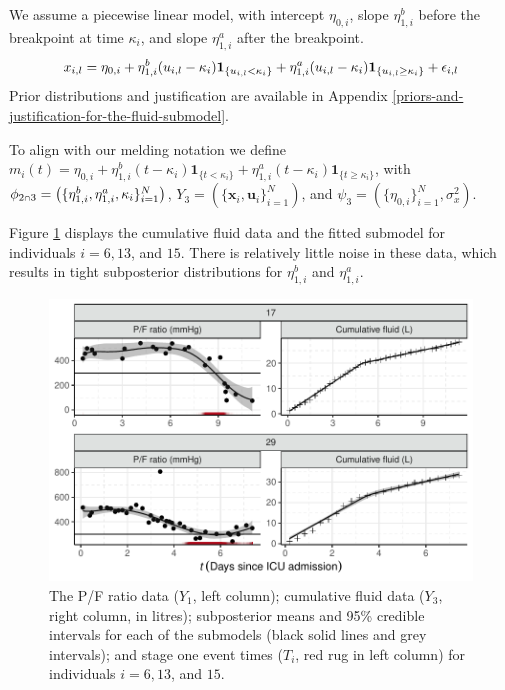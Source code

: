 \documentclass[
  10pt,
  a4paper,
]{article}
\let\Oldcap\cap
\renewcommand{\cap}{\mathrel{\mathsmaller{\Oldcap}}}
\begin{document}
We assume a piecewise linear model, with intercept \(\eta_{0, i}\),
slope \(\eta_{1, i}^{b}\) before the breakpoint at time \(\kappa_{i}\),
and slope \(\eta_{1, i}^{a}\) after the breakpoint. \begin{equation}
  x_{i, l} = \eta_{0, i} + \eta^{b}_{1, i}(u_{i, l} - \kappa_{i})\boldsymbol{1}_{\{u_{i, l} < \kappa_{i}\}} + \eta^{a}_{1, i}(u_{i, l} - \kappa_{i})\boldsymbol{1}_{\{u_{i, l} \geq \kappa_{i}\}} + \epsilon_{i, l} \\
   \label{eqn:piecewise-fluid-model}
\end{equation} Prior distributions and justification are available in
Appendix \ref{priors-and-justification-for-the-fluid-submodel}.

To align with our melding notation we define
\(m_{i}(t) = \eta_{0, i} + \eta^{b}_{1, i}(t - \kappa_{i})\boldsymbol{1}_{\{t < \kappa_{i}\}} + \eta^{a}_{1, i}(t - \kappa_{i})\boldsymbol{1}_{\{t \geq \kappa_{i}\}}\),
with
\(\phi_{2 \cap 3} = \left(\{\eta^{b}_{1, i}, \eta^{a}_{1, i}, \kappa_{i}\}_{i = 1}^{N}\right)\),
\(Y_{3} = (\{\boldsymbol{x}_{i}, \boldsymbol{u}_{i}\}_{i = 1}^{N})\),
and \(\psi_{3} = (\{\eta_{0, i}\}_{i = 1}^{N}, \sigma^{2}_{x})\).

Figure \ref{fig:pf_fit_and_fluid_fit_plot} displays the cumulative fluid
data and the fitted submodel for individuals \(i = 6, 13\), and \(15\).
There is relatively little noise in these data, which results in tight
subposterior distributions for \(\eta_{1, i}^{b}\) and
\(\eta_{1, i}^{a}\).

\begin{figure}

{\centering \includegraphics{../plots/mimic-example/combined-pf-fluid-fit-plot-small} 

}

\caption{The P/F ratio data ($Y_{1}$, left column); cumulative fluid data ($Y_{3}$, right column, in litres); subposterior means and 95\% credible intervals for each of the submodels (black solid lines and grey intervals); and stage one event times ($T_{i}$, red rug in left column) for individuals $i = 6, 13$, and $15$.}\label{fig:pf_fit_and_fluid_fit_plot}
\end{figure}
\end{document}
